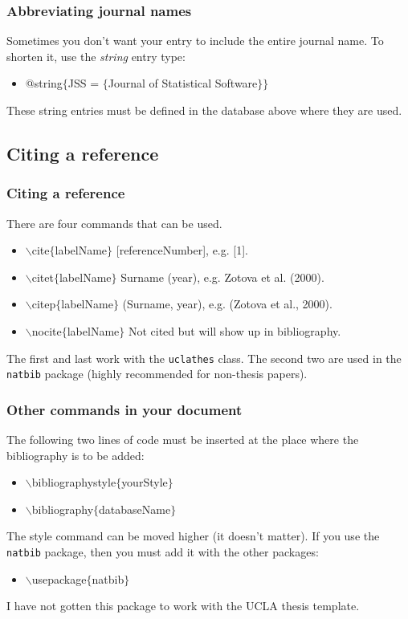 \begin{frame}  \frametitle{Abbreviating journal names}
	Sometimes you don't want your entry to include the entire journal name. To shorten it, use the \textit{string} entry type:
	\begin{itemize}
		\item[] @string$\{$JSS = $\{$Journal of Statistical Software$\}\}$
	\end{itemize}
	These string entries must be defined in the database above where they are used.
\end{frame}

\subsection{Citing a reference}

\begin{frame}  \frametitle{Citing a reference}
	There are four commands that can be used.
	\begin{itemize}
		\item {\color{command}$\backslash$cite\color{braces}$\{${\color{black}labelName}$\}$} [referenceNumber], e.g. [1].
		\item {\color{command}$\backslash$citet\color{braces}$\{${\color{black}labelName}$\}$} Surname (year), e.g. Zotova et al. (2000).
		\item {\color{command}$\backslash$citep\color{braces}$\{${\color{black}labelName}$\}$} (Surname, year), e.g. (Zotova et al., 2000).
		\item {\color{command}$\backslash$nocite\color{braces}$\{${\color{black}labelName}$\}$} Not cited but will show up in bibliography.
	\end{itemize}
	The first and last work with the \texttt{\color{highlight}uclathes} class. The second two are used in the \texttt{\color{highlight}natbib} package (highly recommended for non-thesis papers).
\end{frame}

\begin{frame}  \frametitle{Other commands in your document}
	The following two lines of code must be inserted at the place where the bibliography is to be added:
	\begin{itemize}
		\item[] {\color{command}$\backslash$bibliographystyle\color{braces}$\{${\color{black}yourStyle}$\}$}
		\item[] {\color{command}$\backslash$bibliography\color{braces}$\{${\color{black}databaseName}$\}$}
	\end{itemize}
	The style command can be moved higher (it doesn't matter). If you use the \texttt{\color{highlight}natbib} package, then you must add it with the other packages:
	\begin{itemize}
		\item[] {\color{command}$\backslash$usepackage\color{braces}$\{${\color{black}natbib}$\}$}
	\end{itemize}
	I have not gotten this package to work with the UCLA thesis template.
\end{frame}

